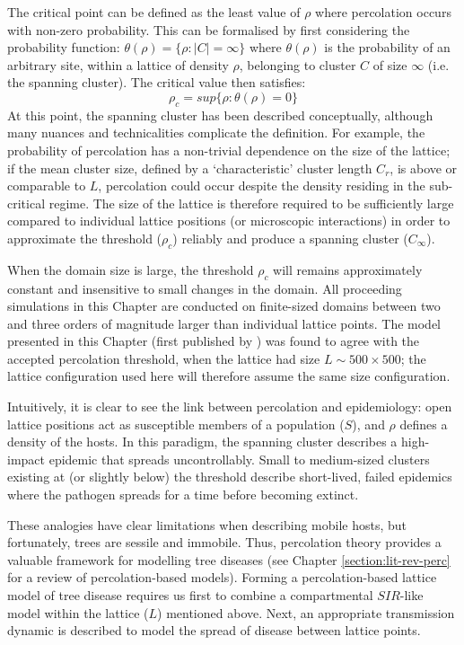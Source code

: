 The critical point can be defined as the least value of $\rho$ where percolation occurs with non-zero probability. %
This can be formalised by first considering the probability function: $\theta (\rho)= \lbrace \rho:|C|=\infty\rbrace$ where $\theta(\rho)$ is the probability of an arbitrary site, %
within a lattice of density $\rho$, belonging to cluster $C$ of size $\infty$ (i.e. the spanning cluster). %
The critical value then satisfies: %
\begin{equation}
\label{eq:critical_threshold_1d}
    \rho _{c}=sup \lbrace \rho : \theta (\rho ) = 0 \rbrace
\end{equation}
At this point, the spanning cluster has been described conceptually, although many nuances and technicalities complicate the definition. %
For example, the probability of percolation has a non-trivial dependence on the size of the lattice;
if the mean cluster size, defined by a `characteristic' cluster length $C_r$, is above or comparable to $L$, 
percolation could occur despite the density residing in the sub-critical regime. %
The size of the lattice is therefore required to be sufficiently large compared to individual lattice positions (or microscopic interactions) 
in order to approximate the threshold ($\rho_c$) reliably and produce a spanning cluster ($C_{\infty}$). 

When the domain size is large, the threshold $\rho_c$ will remains approximately constant and insensitive to small changes in the domain. 
All proceeding simulations in this Chapter are conducted on finite-sized domains between two and three orders of magnitude larger than individual lattice points.
The model presented in this Chapter (first published by \cite{OROZCOFUENTES201912}) was 
found to agree with the accepted percolation threshold, when the lattice had size $L \sim 500\times500$;
the lattice configuration used here will therefore assume the same size configuration. 

Intuitively, it is clear to see the link between percolation and epidemiology: 
open lattice positions act as susceptible members of a population ($S$), and $\rho$ defines a density of the hosts. 
In this paradigm, the spanning cluster describes a high-impact epidemic that spreads uncontrollably. 
Small to medium-sized clusters existing at (or slightly below) the threshold describe short-lived, 
failed epidemics where the pathogen spreads for a time before becoming extinct.

These analogies have clear limitations when describing mobile hosts, but fortunately, trees are sessile and immobile.
Thus, percolation theory provides a valuable framework for modelling tree diseases (see Chapter \ref{section:lit-rev-perc} 
for a review of percolation-based models). 
Forming a percolation-based lattice model of tree disease requires us first to combine a compartmental $SIR$-like model within the lattice ($L$) mentioned above. %
Next, an appropriate transmission dynamic is described to model the spread of disease between lattice points.


